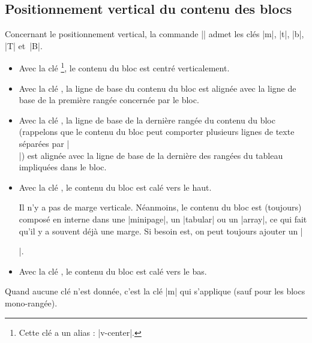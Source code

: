 \documentclass[dvipsnames]{article}
\begin{document}
\subsection{Positionnement vertical du contenu des blocs}


\label{vertical-pos-block}

Concernant le positionnement vertical, la commande |\Block| admet les clés
|m|, |t|, |b|, |T| et~|B|.


\begin{itemize}
\item {}
Avec la clé \footnote{Cette clé a un alias : |v-center|.}, le
contenu du bloc est centré verticalement. 

\item Avec la clé , la ligne de base du contenu du bloc est alignée avec la
ligne de base de la première rangée concernée par le bloc.

\item Avec la clé , la ligne de base de la dernière rangée du
contenu du bloc (rappelons que le contenu du bloc peut comporter plusieurs
lignes de texte séparées par |\\|) est alignée avec la ligne de base de la
dernière des rangées du tableau impliquées dans le bloc.

\item Avec la clé , le contenu du bloc est calé vers le haut.

Il n'y a pas de marge verticale. Néanmoins, le contenu du bloc est (toujours)
composé en interne dans une |{minipage}|, un |{tabular}| ou un |{array}|, ce qui
fait qu'il y a souvent déjà une marge. Si besoin est, on peut toujours ajouter
un |\strut|.

\item Avec la clé , le contenu du bloc est calé vers le bas.
\end{itemize}

Quand aucune clé n'est donnée, c'est la clé |m| qui s'applique (sauf pour
les blocs mono-rangée).
\end{document}
